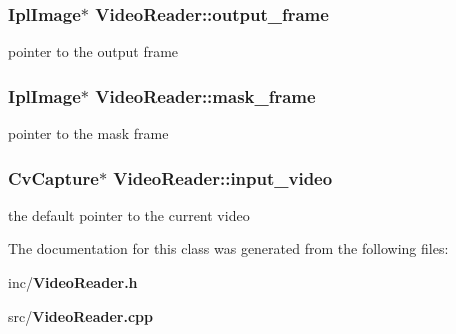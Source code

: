 \subsubsection{\setlength{\rightskip}{0pt plus 5cm}IplImage$\ast$ {\bf VideoReader::output\_\-frame}}\label{classVideoReader_b1d8d47cc477bab514a1b37781402df7}


pointer to the output frame 

\subsubsection{\setlength{\rightskip}{0pt plus 5cm}IplImage$\ast$ {\bf VideoReader::mask\_\-frame}}\label{classVideoReader_a9816e1cc6e0c29b68722ed942b15bb2}


pointer to the mask frame 

\subsubsection{\setlength{\rightskip}{0pt plus 5cm}CvCapture$\ast$ {\bf VideoReader::input\_\-video}}\label{classVideoReader_9e3f3eaa1e28aa3693584284f7240a1d}


the default pointer to the current video 



The documentation for this class was generated from the following files:\begin{CompactItemize}
\item 
inc/{\bf VideoReader.h}\item 
src/{\bf VideoReader.cpp}\end{CompactItemize}
